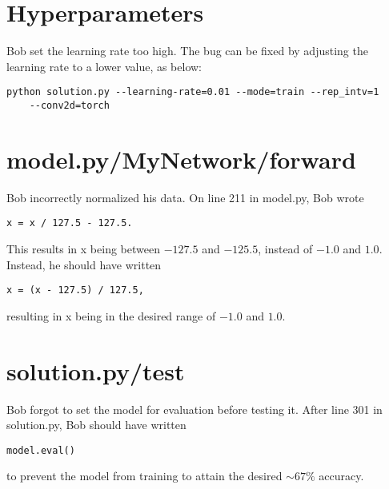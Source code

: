 \documentclass[11pt]{article}
\begin{document}
\section*{Hyperparameters}
Bob set the learning rate too high.
The bug can be fixed by adjusting the learning rate to a lower value, as below:
\begin{lstlisting}
python solution.py --learning-rate=0.01 --mode=train --rep_intv=1
	--conv2d=torch
\end{lstlisting}


\section*{model.py/MyNetwork/forward}
Bob incorrectly normalized his data.
On line 211 in model.py, Bob wrote
\begin{lstlisting}
x = x / 127.5 - 127.5.
\end{lstlisting}
This results in x being between $-127.5$ and $-125.5$, instead of $-1.0$ and $1.0$.
Instead, he should have written
\begin{lstlisting}
x = (x - 127.5) / 127.5,
\end{lstlisting}
resulting in x being in the desired range of $-1.0$ and $1.0$.


\section*{solution.py/test}
Bob forgot to set the model for evaluation before testing it.
After line 301 in solution.py, Bob should have written
\begin{lstlisting}
model.eval()
\end{lstlisting}
to prevent the model from training to attain the desired $\sim67\%$ accuracy.
\end{document}
